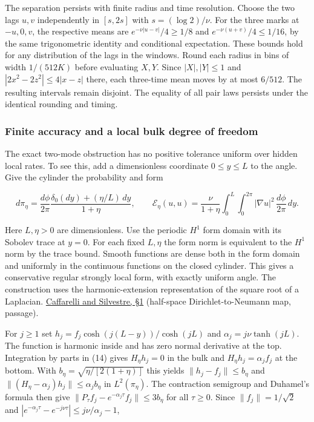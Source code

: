 \documentclass[11pt,a4paper]{article}
\begin{document}
The separation persists with finite radius and time resolution. Choose
the two lags \(u,v\) independently in \([s,2s]\) with \(s=(\log2)/\nu\).
For the three marks at \(-u,0,v\), the respective means are
\(e^{-\nu|u-v|}/4\ge1/8\) and \(e^{-\nu(u+v)}/4\le1/16\), by the same
trigonometric identity and conditional expectation. These bounds hold
for any distribution of the lags in the windows. Round each radius in
bins of width \(1/(512K)\) before evaluating \(X,Y\). Since
\(|X|,|Y|\le1\) and \(|2x^2-2z^2|\le4|x-z|\) there, each three-time mean
moves by at most \(6/512\). The resulting intervals remain disjoint. The
equality of all pair laws persists under the identical rounding and
timing.

\subsubsection{Finite accuracy and a local bulk degree of
freedom}\label{finite-accuracy-and-a-local-bulk-degree-of-freedom}

The exact two-mode obstruction has no positive tolerance uniform over
hidden local rates. To see this, add a dimensionless coordinate
\(0\le y\le L\) to the angle. Give the cylinder the probability and form

\[
 d\pi_\eta=\frac{d\phi}{2\pi}\frac{\delta_0(dy)+(\eta/L)\,dy}{1+\eta},
 \qquad
 \mathcal E_\eta(u,u)=\frac{\nu}{1+\eta}
  \int_0^L\int_0^{2\pi}|\nabla u|^2\,\frac{d\phi}{2\pi}\,dy .     \tag{14}
\]

Here \(L,\eta>0\) are dimensionless. Use the periodic \(H^1\) form
domain with its Sobolev trace at \(y=0\). For each fixed \(L,\eta\) the
form norm is equivalent to the \(H^1\) norm by the trace bound. Smooth
functions are dense both in the form domain and uniformly in the
continuous functions on the closed cylinder. This gives a conservative
regular strongly local form, with exactly uniform angle. The
construction uses the harmonic-extension representation of the square
root of a Laplacian.
\href{https://arxiv.org/pdf/math/0608640}{Caffarelli and Silvestre, §1}
(half-space Dirichlet-to-Neumann map, passage).

For \(j\ge1\) set \(h_j=f_j\cosh(j(L-y))/\cosh(jL)\) and
\(\alpha_j=j\nu\tanh(jL)\). The function is harmonic inside and has zero
normal derivative at the top. Integration by parts in (14) gives
\(H_\eta h_j=0\) in the bulk and \(H_\eta h_j=\alpha_j f_j\) at the
bottom. With \(b_\eta=\sqrt{\eta/[2(1+\eta)]}\) this yields
\(\|h_j-f_j\|\le b_\eta\) and
\(\|(H_\eta-\alpha_j)h_j\|\le\alpha_j b_\eta\) in \(L^2(\pi_\eta)\). The
contraction semigroup and Duhamel's formula then give
\(\|P_\tau f_j-e^{-\alpha_j\tau}f_j\|\le3b_\eta\) for all \(\tau\ge0\).
Since \(\|f_j\|=1/\sqrt2\) and
\(|e^{-\alpha_j\tau}-e^{-j\nu\tau}|\le j\nu/\alpha_j-1\),
\end{document}
